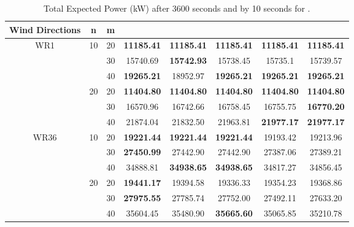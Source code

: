 \documentclass[preprint,12pt]{elsarticle}
\newcommand{\qcls}{{\sf {\small QC-LS\xspace}}}
\newcommand{\ilpls}{{\sf {\small ILP-LS\xspace}}}
\newcommand{\qcss}{{\sf {\small QC-SS\xspace}}}
\newcommand{\qulsgrb}{{\sf {\small QU-LS(GRB)\xspace}}}
\newcommand{\qulsda}{{\sf {\small QU-LS(DA)\xspace}}}
\begin{document}
\begin{table}[t!]
	\small
	\begin{tabular}{| c | c | c | c | c | c | c | c |}
		\toprule
		Wind Directions  & n  & m  & \qulsda  & \qulsgrb  & \qcls & \qcss  & \ilpls  \\
		\toprule
		\multirow{6}{*}{WR1}  & \multirow{3}{*}{10}       & 20       & \textbf{11185.41} & \textbf{11185.41} & \textbf{11185.41} & \textbf{11185.41} & \textbf{11185.41} \\
		& & 30   & 15740.69 & \textbf{15742.93}  & 15738.45  & 15735.1  & 15739.57     \\
		& & 40 & \textbf{19265.21} & 18952.97 & \textbf{19265.21}  & \textbf{19265.21} & \textbf{19265.21}                \\
		\cline{2-8}
		&\multirow{3}{*}{20}   & 20       & \textbf{11404.80}  & \textbf{11404.80}  & \textbf{11404.80}  & \textbf{11404.80}  & \textbf{11404.80}          \\
		&&30   & 16570.96 & 16742.66  & 16758.45  & 16755.75 & \textbf{16770.20 }                 \\
		&&40   & 21874.04 & 21832.50  & 21963.81 & \textbf{21977.17} & \textbf{21977.17}        \\
		\hline
		\multirow{6}{*}{WR36} &  \multirow{3}{*}{10}    & 20       & \textbf{19221.44} & \textbf{19221.44} & \textbf{19221.44} & 19193.42 & 19213.96 \\
		&& 30  & \textbf{27450.99} & 27442.90 & 27442.90 & 27387.06 & 27389.21                     \\
		&&40   & 34888.81 & \textbf{34938.65} & \textbf{34938.65} & 34817.27  & 34856.45          \\
		\cline{2-8}
		&  \multirow{3}{*}{20}   & 20   & \textbf{19441.17}  & 19394.58 & 19336.33 & 19354.23  & 19368.86            \\
		&&30   & \textbf{27975.55} & 27785.74  & 27752.00 & 27492.11  & 27633.20                      \\
		&&40   & 35604.45 & 35480.90 & \textbf{35665.60}   & 35065.85 & 35210.78 \\
		\bottomrule                   
	\end{tabular}
	
	\vspace{0.5em}
	\caption{Total Expected Power (kW) after 3600 seconds and by 10 seconds for \qulsda{}.}\label{tab:results2}
\end{table}
\end{document}

